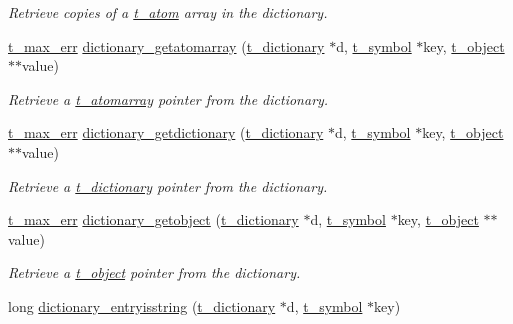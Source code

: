 \begin{DoxyCompactItemize}
\begin{DoxyCompactList}\small\item\em Retrieve copies of a \hyperlink{structt__atom}{t\_\-atom} array in the dictionary. \item\end{DoxyCompactList}\item 
\hyperlink{group__datatypes_ga73edaae82b318855cc09fac994918165}{t\_\-max\_\-err} \hyperlink{group__dictionary_gabc3bc4db8dc0898593722338262743e1}{dictionary\_\-getatomarray} (\hyperlink{structt__dictionary}{t\_\-dictionary} $\ast$d, \hyperlink{structt__symbol}{t\_\-symbol} $\ast$key, \hyperlink{structt__object}{t\_\-object} $\ast$$\ast$value)
\begin{DoxyCompactList}\small\item\em Retrieve a \hyperlink{structt__atomarray}{t\_\-atomarray} pointer from the dictionary. \item\end{DoxyCompactList}\item 
\hyperlink{group__datatypes_ga73edaae82b318855cc09fac994918165}{t\_\-max\_\-err} \hyperlink{group__dictionary_ga1bcef0af352c4f9df233818028083ea7}{dictionary\_\-getdictionary} (\hyperlink{structt__dictionary}{t\_\-dictionary} $\ast$d, \hyperlink{structt__symbol}{t\_\-symbol} $\ast$key, \hyperlink{structt__object}{t\_\-object} $\ast$$\ast$value)
\begin{DoxyCompactList}\small\item\em Retrieve a \hyperlink{structt__dictionary}{t\_\-dictionary} pointer from the dictionary. \item\end{DoxyCompactList}\item 
\hyperlink{group__datatypes_ga73edaae82b318855cc09fac994918165}{t\_\-max\_\-err} \hyperlink{group__dictionary_gabcf91529e619908aebd380030c697052}{dictionary\_\-getobject} (\hyperlink{structt__dictionary}{t\_\-dictionary} $\ast$d, \hyperlink{structt__symbol}{t\_\-symbol} $\ast$key, \hyperlink{structt__object}{t\_\-object} $\ast$$\ast$value)
\begin{DoxyCompactList}\small\item\em Retrieve a \hyperlink{structt__object}{t\_\-object} pointer from the dictionary. \item\end{DoxyCompactList}\item 
long \hyperlink{group__dictionary_gac60faf9cb165c96aced356959f1faeb3}{dictionary\_\-entryisstring} (\hyperlink{structt__dictionary}{t\_\-dictionary} $\ast$d, \hyperlink{structt__symbol}{t\_\-symbol} $\ast$key)
$$
\end{DoxyCompactItemize}
